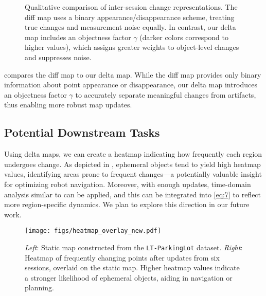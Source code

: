\begin{figure}[!t]
    \centering
    \caption{
    Qualitative comparison of inter-session change representations. The diff map \cite{kim2022lt} uses a binary appearance/disappearance scheme, treating true changes and measurement noise equally. In contrast, our delta map includes an objectness factor $\gamma$ (darker colors correspond to higher values), which assigns greater weights to object-level changes and suppresses noise.
    }
    \label{fig:density}
    \vspace{-3mm}
\end{figure}

 compares the diff map \cite{kim2022lt} to our delta map.
While the diff map provides only binary information about point appearance or disappearance, our delta map introduces an objectness factor $\gamma$ to accurately separate meaningful changes from artifacts, thus enabling more robust map updates.


\subsection{Potential Downstream Tasks}
Using delta maps, we can create a heatmap indicating how frequently each region undergoes change. As depicted in , ephemeral objects tend to yield high heatmap values, identifying areas prone to frequent changes---a potentially valuable insight for optimizing robot navigation.  
Moreover, with enough updates, time-domain analysis similar to \cite{krajnik2017fremen} can be applied, and this can be integrated into \eqref{eq:7} to reflect more region-specific dynamics. We plan to explore this direction in our future work.

\begin{figure}[!t]
    \centering
    \texttt{[image: figs/heatmap\_overlay\_new.pdf]}
    \caption{
    \textsl{Left}: Static map constructed from the \texttt{LT-ParkingLot} dataset. 
    \textsl{Right}: Heatmap of frequently changing points after updates from six sessions, overlaid on the static map. Higher heatmap values indicate a stronger likelihood of ephemeral objects, aiding in navigation or planning.
    }
    \label{fig:applications}
    \vspace{-3mm}
\end{figure}
